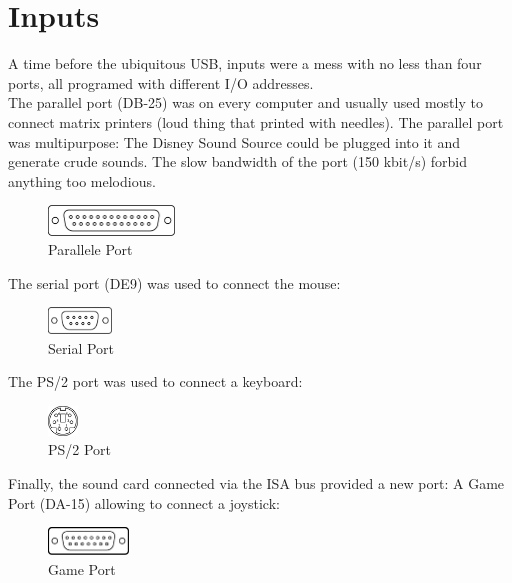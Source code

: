 \documentclass[book.tex]{subfiles}
\begin{document}
\section{Inputs}
A time before the ubiquitous USB, inputs were a mess with no less than four ports, all programed with different I/O addresses.\\

The parallel port (DB-25) was on every computer and usually used mostly to connect matrix printers (loud thing that printed with needles). The parallel port was multipurpose: The Disney Sound Source could be plugged into it and generate crude sounds. The slow bandwidth of the port (150 kbit/s) forbid anything too melodious.\\
 \begin{figure}[H]
\centering
\includegraphics[width=0.3\textwidth]{imgs/drawings/ports/DB-25_parallel_port.eps}
\caption{Parallele Port}
\label{fig:parallelPort}
\end{figure}


The serial port (DE9) was used to connect the mouse:
 \begin{figure}[H]
\centering
\includegraphics[width=0.15\textwidth]{imgs/drawings/ports/DE9_serial_port.eps}
\caption{Serial Port}
\label{fig:serialPort}
\end{figure}

The PS/2 port was used to connect a keyboard:
 \begin{figure}[H]
\centering
\includegraphics[width=0.07\textwidth]{imgs/drawings/ports/MiniDIN-6_PS2.eps}
\caption{PS/2 Port}
\label{fig:ps2Port}
\end{figure}


Finally, the sound card connected via the ISA bus provided a new port: A Game Port (DA-15) allowing to connect a joystick:
 \begin{figure}[H]
\centering
\includegraphics[width=0.19\textwidth]{imgs/drawings/ports/DA-15_GamePort.eps}
\caption{Game Port}
\label{fig:gamePort}
\end{figure}
\end{document}
